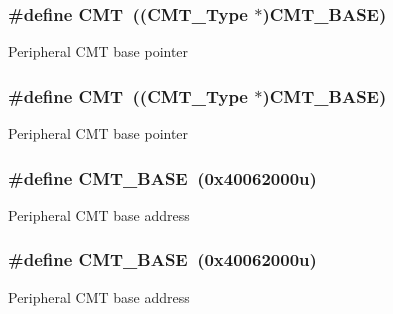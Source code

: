 \subsubsection[{\texorpdfstring{C\+MT}{CMT}}]{\setlength{\rightskip}{0pt plus 5cm}\#define C\+MT~(({\bf C\+M\+T\+\_\+\+Type} $\ast$){\bf C\+M\+T\+\_\+\+B\+A\+SE})}\hypertarget{group__CMT__Peripheral__Access__Layer_ga20a0cd761e563c3a1a75267b661ac5b8}{}\label{group__CMT__Peripheral__Access__Layer_ga20a0cd761e563c3a1a75267b661ac5b8}
Peripheral C\+MT base pointer 
\subsubsection[{\texorpdfstring{C\+MT}{CMT}}]{\setlength{\rightskip}{0pt plus 5cm}\#define C\+MT~(({\bf C\+M\+T\+\_\+\+Type} $\ast$){\bf C\+M\+T\+\_\+\+B\+A\+SE})}\hypertarget{group__CMT__Peripheral__Access__Layer_ga20a0cd761e563c3a1a75267b661ac5b8}{}\label{group__CMT__Peripheral__Access__Layer_ga20a0cd761e563c3a1a75267b661ac5b8}
Peripheral C\+MT base pointer 
\subsubsection[{\texorpdfstring{C\+M\+T\+\_\+\+B\+A\+SE}{CMT_BASE}}]{\setlength{\rightskip}{0pt plus 5cm}\#define C\+M\+T\+\_\+\+B\+A\+SE~(0x40062000u)}\hypertarget{group__CMT__Peripheral__Access__Layer_ga53e160517651b4460f52bf43fe1e197a}{}\label{group__CMT__Peripheral__Access__Layer_ga53e160517651b4460f52bf43fe1e197a}
Peripheral C\+MT base address 
\subsubsection[{\texorpdfstring{C\+M\+T\+\_\+\+B\+A\+SE}{CMT_BASE}}]{\setlength{\rightskip}{0pt plus 5cm}\#define C\+M\+T\+\_\+\+B\+A\+SE~(0x40062000u)}\hypertarget{group__CMT__Peripheral__Access__Layer_ga53e160517651b4460f52bf43fe1e197a}{}\label{group__CMT__Peripheral__Access__Layer_ga53e160517651b4460f52bf43fe1e197a}
Peripheral C\+MT base address 
